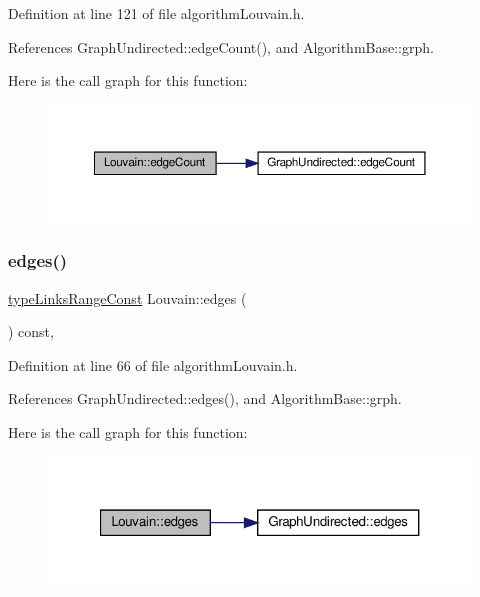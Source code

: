 Definition at line 121 of file algorithm\+Louvain.\+h.



References Graph\+Undirected\+::edge\+Count(), and Algorithm\+Base\+::grph.

Here is the call graph for this function\+:
\nopagebreak
\begin{figure}[H]
\begin{center}
\leavevmode
\includegraphics[width=350pt]{classLouvain_a679f4a903e8d2199ab9ec206b999ce0a_cgraph}
\end{center}
\end{figure}
\mbox{\label{classLouvain_a127146c7b0a173c50291cf0675b2e75d}} 
\subsubsection{\texorpdfstring{edges()}{edges()}}
{\footnotesize\ttfamily \hyperlink{graphInterface_8h_ae8d27008f15586bbf419af7ad2e0a48a}{type\+Links\+Range\+Const} Louvain\+::edges (\begin{DoxyParamCaption}{ }\end{DoxyParamCaption}) const\hspace{0.3cm}{\ttfamily [inline]}, {\ttfamily [private]}}



Definition at line 66 of file algorithm\+Louvain.\+h.



References Graph\+Undirected\+::edges(), and Algorithm\+Base\+::grph.

Here is the call graph for this function\+:
\nopagebreak
\begin{figure}[H]
\begin{center}
\leavevmode
\includegraphics[width=321pt]{classLouvain_a127146c7b0a173c50291cf0675b2e75d_cgraph}
\end{center}
\end{figure}
\mbox{\label{classLouvain_ac95d6e53e46b6321aa02b80f0c69bd13}} 
